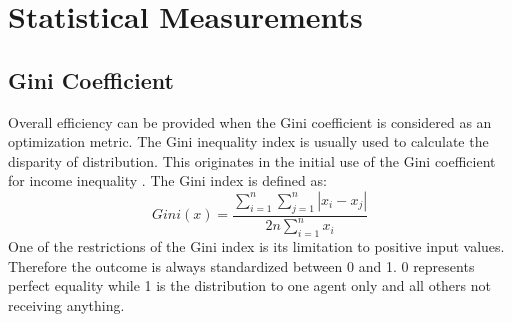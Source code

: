 \documentclass[german, a4paper, 11pt, oneside]{scrbook}
\begin{document}
\section{Statistical Measurements}
\subsection{Gini Coefficient}
Overall efficiency can be provided when the Gini coefficient is considered as an optimization metric. The Gini inequality index is usually used to calculate the disparity of distribution. This originates in the initial use of the Gini coefficient for income inequality \cite{Ek}. 
The Gini index is defined as: 
\[
  \mathit{Gini}(x) = \frac{\sum_{i=1}^n \sum_{j=1}^n | x_i - x_j| }{2 n \sum_{i=1}^n x_i} 
\] \cite{Ek}
One of the restrictions of the Gini index is its limitation to positive input values. Therefore the outcome is always standardized between 0 and 1. \cite{Ek} 0 represents perfect equality while 1 is the distribution to one agent only and all others not receiving anything.\\
\end{document}
